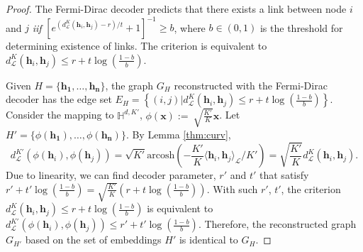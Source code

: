 \documentclass{article}
\newcommand{\cut}[1]{}
\begin{document}
\vspace{5pt}
\loss*
\begin{proof}
The Fermi-Dirac decoder predicts that there exists a link between node $i$ and $j$ \emph{iif}
$\left[ e^{(d_\mathcal{L}^K(\mathbf{h}_i, \mathbf{h}_j)-r)/t }+ 1 \right]^{-1} \ge b$, where $b \in (0,1)$ is the threshold for determining existence of links.
The criterion is equivalent to $d_\mathcal{L}^K(\mathbf{h}_i, \mathbf{h}_j) \le r + t \log (\frac{1-b}{b})$.

Given $H = \{\mathbf{h_1}, \ldots, \mathbf{h_n}\}$, the graph $G_H$ reconstructed with the Fermi-Dirac decoder has the edge set $E_H = \left\{ (i, j) | d_\mathcal{L}^K(\mathbf{h}_i, \mathbf{h}_j) \le r + t \log (\frac{1-b}{b}) \right\}$.
Consider the mapping to $\mathbb{H}^{d,K'}$, $\phi(\mathbf{x}):= \ \sqrt{\frac{K'}{K}} \mathbf{x}$.
Let $H' = \{\phi(\mathbf{h_1}), \ldots, \phi(\mathbf{h_n})\}$.
By Lemma \ref{thm:curv}, 
\begin{equation}
    d_\mathcal{L}^{K'}(\phi(\mathbf{h}_i), \phi(\mathbf{h}_j)) = \sqrt{K'} \mathrm{arcosh} \left( - \frac{K'}{K} \langle\mathbf{h}_i,\mathbf{h}_j\rangle_\mathcal{L} / K' \right)
    = \sqrt{\frac{K'}{K}} d_\mathcal{L}^{K}(\mathbf{h}_i, \mathbf{h}_j).
\end{equation}
Due to linearity, we can find decoder parameter, $r'$ and $t'$ that satisfy 
$ r' + t' \log (\frac{1-b}{b}) = \sqrt{\frac{K'}{K}} ( r + t \log (\frac{1-b}{b}))$.
With such $r'$, $t'$, the criterion $d_\mathcal{L}^K(\mathbf{h}_i, \mathbf{h}_j) \le r + t \log (\frac{1-b}{b})$
is equivalent to $d_\mathcal{L}^{K'}(\phi(\mathbf{h}_i), \phi(\mathbf{h}_j)) \le r' + t' \log (\frac{1-b}{b})$.
Therefore, the reconstructed graph $G_{H'}$ based on the set of embeddings $H'$ is identical to $G_H$.
\end{proof}

\cut{
\subsection{Lorentzian Centroid Appoximation}
Aggregation via the Lorentzian Centroid Approximation can be defined as
\begin{align}
w_{ij} &= \textsc{Att}(\mathbf{h}^{\ell+1,E}_i, \mathbf{h}^{\ell+1,E}_j) & \text{(attention)}\\ 
    \mathbf{x}^{\ell+1,H}_i &= \sqrt{K_{\ell+1}}\frac{\sum_j w_{ij} \mathbf{x}_j}{|{||\sum_j w_{ij} \mathbf{x}_j||_\mathcal{L}|}} & \text{(aggregation)}
\end{align}}
\end{document}
